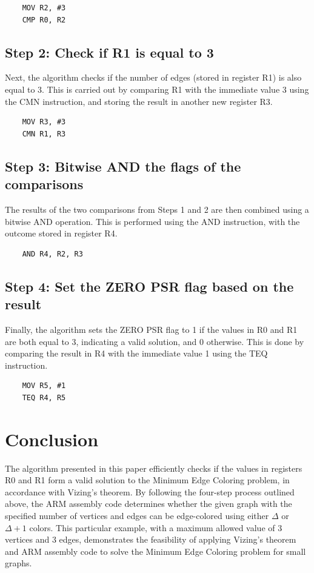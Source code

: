 \begin{verbatim}
    MOV R2, #3
    CMP R0, R2
\end{verbatim}

\subsection{Step 2: Check if R1 is equal to 3}

Next, the algorithm checks if the number of edges (stored in register R1) is also equal to 3. This is carried out by comparing R1 with the immediate value 3 using the CMN instruction, and storing the result in another new register R3.

\begin{verbatim}
    MOV R3, #3
    CMN R1, R3
\end{verbatim}

\subsection{Step 3: Bitwise AND the flags of the comparisons}

The results of the two comparisons from Steps 1 and 2 are then combined using a bitwise AND operation. This is performed using the AND instruction, with the outcome stored in register R4.

\begin{verbatim}
    AND R4, R2, R3
\end{verbatim}

\subsection{Step 4: Set the ZERO PSR flag based on the result}

Finally, the algorithm sets the ZERO PSR flag to 1 if the values in R0 and R1 are both equal to 3, indicating a valid solution, and 0 otherwise. This is done by comparing the result in R4 with the immediate value 1 using the TEQ instruction.

\begin{verbatim}
    MOV R5, #1
    TEQ R4, R5
\end{verbatim}

\section{Conclusion}

The algorithm presented in this paper efficiently checks if the values in registers R0 and R1 form a valid solution to the Minimum Edge Coloring problem, in accordance with Vizing's theorem. By following the four-step process outlined above, the ARM assembly code determines whether the given graph with the specified number of vertices and edges can be edge-colored using either $\Delta$ or $\Delta + 1$ colors. This particular example, with a maximum allowed value of 3 vertices and 3 edges, demonstrates the feasibility of applying Vizing's theorem and ARM assembly code to solve the Minimum Edge Coloring problem for small graphs.



